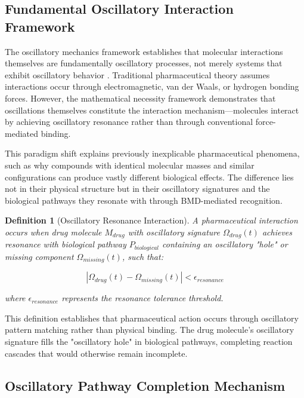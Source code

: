 \documentclass[12pt,a4paper]{article}
\newtheorem{definition}{Definition}[section]
\begin{document}
\subsection{Fundamental Oscillatory Interaction Framework}

The oscillatory mechanics framework establishes that molecular interactions themselves are fundamentally oscillatory processes, not merely systems that exhibit oscillatory behavior \citep{arnold1978mathematical, goldstein2002classical}. Traditional pharmaceutical theory assumes interactions occur through electromagnetic, van der Waals, or hydrogen bonding forces. However, the mathematical necessity framework demonstrates that oscillations themselves constitute the interaction mechanism—molecules interact by achieving oscillatory resonance rather than through conventional force-mediated binding.

This paradigm shift explains previously inexplicable pharmaceutical phenomena, such as why compounds with identical molecular masses and similar configurations can produce vastly different biological effects. The difference lies not in their physical structure but in their oscillatory signatures and the biological pathways they resonate with through BMD-mediated recognition.

\begin{definition}[Oscillatory Resonance Interaction]
A pharmaceutical interaction occurs when drug molecule $M_{drug}$ with oscillatory signature $\Omega_{drug}(t)$ achieves resonance with biological pathway $P_{biological}$ containing an oscillatory "hole" or missing component $\Omega_{missing}(t)$, such that:

\begin{equation}
|\Omega_{drug}(t) - \Omega_{missing}(t)| < \epsilon_{resonance}
\end{equation}

where $\epsilon_{resonance}$ represents the resonance tolerance threshold.
\end{definition}

This definition establishes that pharmaceutical action occurs through oscillatory pattern matching rather than physical binding. The drug molecule's oscillatory signature fills the "oscillatory hole" in biological pathways, completing reaction cascades that would otherwise remain incomplete.

\subsection{Oscillatory Pathway Completion Mechanism}
\end{document}
